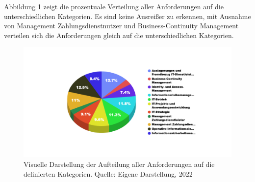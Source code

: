 Abbildung \ref{fig:kategorien_allg_aufteilung} zeigt die prozentuale Verteilung aller Anforderungen auf die unterschiedlichen Kategorien. Es sind keine Ausreißer zu erkennen, mit Ausnahme von \glqq{}Management Zahlungsdienstnutzer\grqq{} und \glqq{}Business-Continuity Management\grqq{} verteilen sich die Anforderungen gleich auf die unterschiedlichen Kategorien. 
\bigbreak
\begin{figure}[H]
    \centering
  \includegraphics[width=\linewidth]{images/uploads/a_figure_02.png}
  \caption{Visuelle Darstellung der Aufteilung aller Anforderungen auf die definierten Kategorien. Quelle: Eigene Darstellung, 2022}
  \label{fig:kategorien_allg_aufteilung}
\end{figure}


